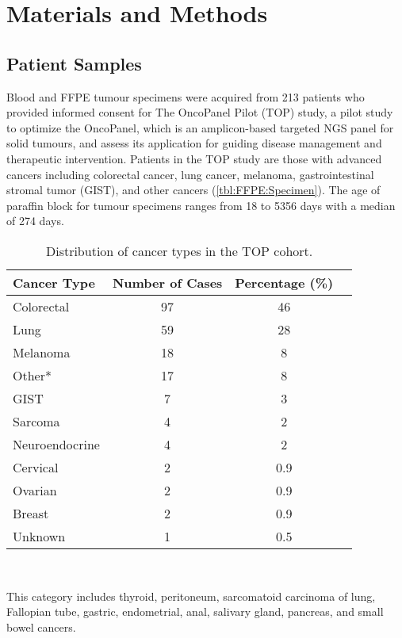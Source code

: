
\chapter{Materials and Methods}
\label{ch:Materialsandmethods}

\section{Patient Samples}
\label{sec:PatientSamples}

Blood and FFPE tumour specimens were acquired from 213 patients who provided informed consent for The OncoPanel Pilot (TOP) study, a pilot study to optimize the OncoPanel, which is an amplicon-based targeted NGS panel for solid tumours, and assess its application for guiding disease management and therapeutic intervention. Patients in the TOP study are those with advanced cancers including colorectal cancer, lung cancer, melanoma, gastrointestinal stromal tumor (GIST), and other cancers (\autoref{tbl:FFPE:Specimen}). The age of paraffin block for tumour specimens ranges from 18 to 5356 days with a median of 274 days.

\begin{table}[!h]
\caption{Distribution of cancer types in the TOP cohort.}
\label{tbl:FFPE:Specimen}
			\centering
      \begin{tabular}{lccc}
        \hline
        Cancer Type & Number of Cases & Percentage (\%) \\ \hline
        Colorectal & 97 & 46 \\
        Lung & 59 & 28 \\
        Melanoma & 18 & 8 \\
				Other* & 17 & 8 \\
				GIST & 7 & 3 \\
				Sarcoma & 4 & 2 \\
				Neuroendocrine & 4 & 2 \\
				Cervical & 2 & 0.9 \\
				Ovarian & 2 & 0.9 \\
				Breast & 2 & 0.9 \\
				Unknown & 1 & 0.5 \\ \hline
      \end{tabular} \\
\end{table}
{\small *This category includes thyroid, peritoneum, sarcomatoid carcinoma of lung, Fallopian tube, gastric, endometrial, anal, salivary gland, pancreas, and small bowel cancers.}

